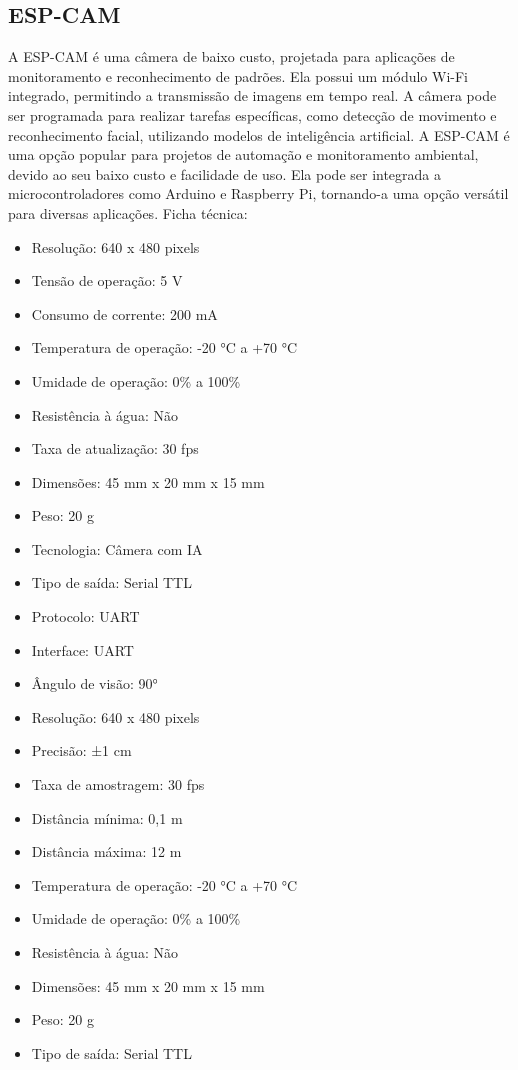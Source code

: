 \subsection{ESP-CAM}
A ESP-CAM é uma câmera de baixo custo, projetada para aplicações de monitoramento e reconhecimento de padrões. Ela possui um módulo Wi-Fi integrado, permitindo a transmissão de imagens em tempo real. A câmera pode ser programada para realizar tarefas específicas, como detecção de movimento e reconhecimento facial, utilizando modelos de inteligência artificial.
A ESP-CAM é uma opção popular para projetos de automação e monitoramento ambiental, devido ao seu baixo custo e facilidade de uso. Ela pode ser integrada a microcontroladores como Arduino e Raspberry Pi, tornando-a uma opção versátil para diversas aplicações.
Ficha técnica:
\begin{itemize}
	\item Resolução: 640 x 480 pixels
	\item Tensão de operação: 5 V
	\item Consumo de corrente: 200 mA
	\item Temperatura de operação: -20 °C a +70 °C
	\item Umidade de operação: 0\% a 100\%
	\item Resistência à água: Não
	\item Taxa de atualização: 30 fps
	\item Dimensões: 45 mm x 20 mm x 15 mm
	\item Peso: 20 g
	\item Tecnologia: Câmera com IA
	\item Tipo de saída: Serial TTL
	\item Protocolo: UART
	\item Interface: UART
	\item Ângulo de visão: 90°
	\item Resolução: 640 x 480 pixels
	\item Precisão: ±1 cm
	\item Taxa de amostragem: 30 fps
	\item Distância mínima: 0,1 m
	\item Distância máxima: 12 m
	\item Temperatura de operação: -20 °C a +70 °C
	\item Umidade de operação: 0\% a 100\%
	\item Resistência à água: Não	
	\item Dimensões: 45 mm x 20 mm x 15 mm
	\item Peso: 20 g
	\item Tipo de saída: Serial TTL
\end{itemize}

